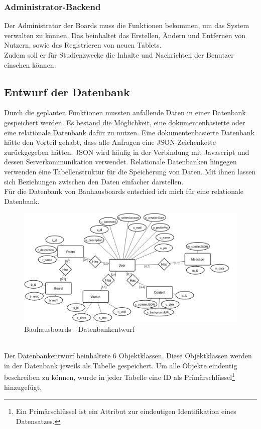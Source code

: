 \subsubsection{Administrator-Backend}\label{Administrator-Backend}
Der Administrator der Boards muss die Funktionen bekommen, um das System verwalten zu können. Das beinhaltet das Erstellen, Ändern und Entfernen von Nutzern, sowie das Registrieren von neuen Tablets.
\\
Zudem soll er für Studienzwecke die Inhalte und Nachrichten der Benutzer einsehen können.

\subsection{Entwurf der Datenbank}\label{Entwurf der Datenbank}
Durch die geplanten Funktionen mussten anfallende Daten in einer Datenbank gespeichert werden.
Es bestand die Möglichkeit, eine dokumentenbasierte oder eine relationale Datenbank dafür zu nutzen.
Eine dokumentenbasierte Datenbank hätte den Vorteil gehabt, dass alle Anfragen eine JSON-Zeichenkette zurückgegeben hätten. JSON wird häufig in der Verbindung mit Javascript und dessen Serverkommunikation verwendet.
Relationale Datenbanken hingegen verwenden eine Tabellenstruktur für die Speicherung von Daten. Mit ihnen lassen sich Beziehungen zwischen den Daten einfacher darstellen.
\\
Für die Datenbank von Bauhausboards entschied ich mich für eine relationale Datenbank.
\begin{figure}[h!]
  \centering
    \includegraphics[width=1\textwidth]{./img/ER01.png}
  \caption{Bauhausboards - Datenbankentwurf}
  \label{img:ER01}
\end{figure}
\\
Der Datenbankentwurf  beinhaltete 6 Objektklassen. Diese Objektklassen werden in der Datenbank jeweils als Tabelle gespeichert. Um alle Objekte eindeutig beschreiben zu können, wurde in jeder Tabelle eine ID als Primärschlüssel\footnote{Ein Primärschlüssel ist ein Attribut zur eindeutigen Identifikation eines Datensatzes.} hinzugefügt.
